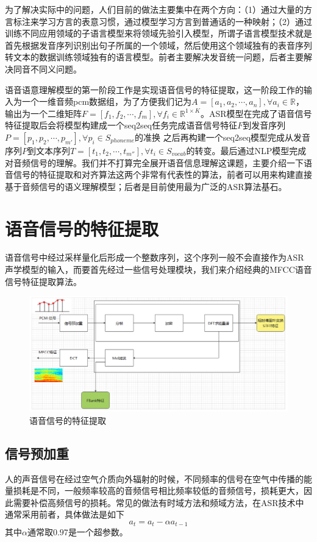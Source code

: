 \documentclass[twoside,a4paper,12pt]{book}%
\begin{document}
为了解决实际中的问题，人们目前的做法主要集中在两个方向：（1）通过大量的方言标注来学习方言的表意习惯，通过模型学习方言到普通话的一种映射；（2）通过训练不同应用领域的子语言模型来将领域先验引入模型，所谓子语言模型技术就是首先根据发音序列识别出句子所属的一个领域，然后使用这个领域独有的表音序列转文本的数据训练领域独有的语言模型。前者主要解决发音统一问题，后者主要解决同音不同义问题。

语音语意理解模型的第一阶段工作是实现语音信号的特征提取，这一阶段工作的输入为一个一维音频pcm数据组，为了方便我们记为$A=[a_1,a_2,\cdots,a_n], \forall a_i \in \mathbb{R}$，输出为一个二维矩阵$F=[f_1,f_2,\cdots,f_m], \forall f_i \in \mathbb{R}^{1 \times K}$。ASR模型在完成了语音信号特征提取后会将模型构建成一个seq2seq任务完成语音信号特征$F$到发音序列$P=[p_1,p_2,\cdots,p_{m'}], \forall p_i \in S_{phoneme} $的准换
之后再构建一个seq2seq模型完成从发音序列$P$到文本序列$T=[t_1,t_2,\cdots,t_{m''}], \forall t_i \in S_{vocab}$的转变。最后通过NLP模型完成对音频信号的理解。我们并不打算完全展开语音信息理解这课题，主要介绍一下语音信号的特征提取和对齐算法这两个非常有代表性的算法，前者可以用来构建直接基于音频信号的语义理解模型；后者是目前使用最为广泛的ASR算法基石。

\section{语音信号的特征提取}
语音信号中经过采样量化后形成一个整数序列，这个序列一般不会直接作为ASR声学模型的输入，而要首先经过一些信号处理模块，我们来介绍经典的MFCC语音信号特征提取算法。
\begin{figure}[htbp]
	\begin{center}
		\includegraphics[width=5.6in]{figures/mfcc2.png}
		\caption{语音信号的特征提取} 
		\label{fig:mfcc2}
	\end{center}
\end{figure}
\subsection{信号预加重}
人的声音信号在经过空气介质向外辐射的时候，不同频率的信号在空气中传播的能量损耗是不同，一般频率较高的音频信号相比频率较低的音频信号，损耗更大，因此需要补偿高频信号的损耗。常见的做法有时域方法和频域方法，在ASR技术中通常采用前者，具体做法是如下
$$
a_t=a_t−\alpha a_{t−1}
$$
其中$\alpha$通常取$0.97$是一个超参数。
\end{document}
